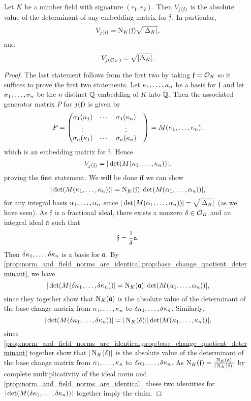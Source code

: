     \begin{proposition}\label{prop:covolume_of_fractional_ideal_under_j}
      Let $K$ be a number field with signature $(r_{1},r_{2})$. Then $V_{j(\mathfrak{f})}$ is the absolute value of the determinant of any embedding matrix for $\mathfrak{f}$. In particular,
      \[
        V_{j(\mathfrak{f})} = \operatorname{\mathrm{N}}_{K}(\mathfrak{f})\sqrt{|\Delta_{K}|},
      \]
      and
      \[
        V_{j(\mathcal{O}_{K})} = \sqrt{|\Delta_{K}|}.
      \]
    \end{proposition}
    \begin{proof}
      The last statement follows from the first two by taking $\mathfrak{f} = \mathcal{O}_{K}$ so it suffices to prove the first two statements. Let $\kappa_{1},\ldots,\kappa_{n}$ be a basis for $\mathfrak{f}$ and let $\sigma_{1},\ldots,\sigma_{n}$ be the $n$ distinct $\mathbb{Q}$-embedding of $K$ into $\overline{\mathbb{Q}}$. Then the associated generator matrix $P$ for $j(\mathfrak{f})$ is given by
      \[
        P = \begin{pmatrix} \sigma_{1}(\kappa_{1}) & \cdots & \sigma_{1}(\kappa_{n}) \\ \vdots & & \vdots & \\ \sigma_{n}(\kappa_{1}) & \cdots & \sigma_{n}(\kappa_{n}) \end{pmatrix} = M(\kappa_{1},\ldots,\kappa_{n}),
      \]
      which is an embedding matrix for $\mathfrak{f}$. Hence
      \[
        V_{j(\mathfrak{f})} = |\det(M(\kappa_{1},\ldots,\kappa_{n}))|,
      \]
      proving the first statement. We will be done if we can show
      \[
        |\det(M(\kappa_{1},\ldots,\kappa_{n}))| = \operatorname{\mathrm{N}}_{K}(\mathfrak{f})|\det(M(\alpha_{1},\ldots,\alpha_{n}))|,
      \]
      for any integral basis $\alpha_{1},\ldots,\alpha_{n}$ since $|\det(M(\alpha_{1},\ldots,\alpha_{n}))| = \sqrt{|\Delta_{K}|}$ (as we have seen). As $\mathfrak{f}$ is a fractional ideal, there exists a nonzero $\delta \in \mathcal{O}_{K}$ and an integral ideal $\mathfrak{a}$ such that
      \[
        \mathfrak{f} = \frac{1}{\delta}\mathfrak{a}.
      \]
      Then $\delta\kappa_{1},\ldots,\delta\kappa_{n}$ is a basis for $\mathfrak{a}$. By \cref{prop:norm_and_field_norms_are_identical,prop:base_change_quotient_determinant}, we have
      \[
        |\det(M(\delta\kappa_{1},\ldots,\delta\kappa_{n}))| = \operatorname{\mathrm{N}}_{K}(\mathfrak{a})|\det(M(\alpha_{1},\ldots,\alpha_{n}))|,
      \]
      since they together show that $\operatorname{\mathrm{N}}_{K}(\mathfrak{a})$ is the absolute value of the determinant of the base change matrix from $\kappa_{1},\ldots,\kappa_{n}$ to $\delta\kappa_{1},\ldots,\delta\kappa_{n}$. Similarly,
      \[
        |\det(M(\delta\kappa_{1},\ldots,\delta\kappa_{n}))| = |\operatorname{\mathrm{N}}_{K}(\delta)||\det(M(\kappa_{1},\ldots,\kappa_{n}))|,
      \]
      since \cref{prop:norm_and_field_norms_are_identical,prop:base_change_quotient_determinant} together show that $|\operatorname{\mathrm{N}}_{K}(\delta)|$ is the absolute value of the determinant of the base change matrix from $\kappa_{1},\ldots,\kappa_{n}$ to $\delta\kappa_{1},\ldots,\delta\kappa_{n}$. As $\operatorname{\mathrm{N}}_{K}(\mathfrak{f}) = \frac{\operatorname{\mathrm{N}}_{K}(\mathfrak{a})}{|\operatorname{\mathrm{N}}_{K}(\delta)|}$ by complete multiplicativity of the ideal norm and \cref{prop:norm_and_field_norms_are_identical}, these two identities for $|\det(M(\delta\kappa_{1},\ldots,\delta\kappa_{n}))|$ together imply the claim.
    \end{proof}
    
